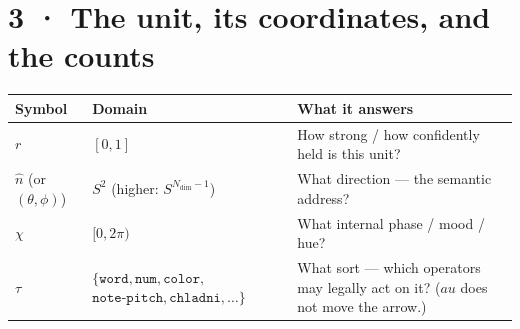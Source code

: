 \documentclass[10.5pt]{article}
\begin{document}
\section*{3 · The unit, its coordinates, and the counts}
{\small\setlength{\tabcolsep}{4pt}\begin{longtable}{L{3.0cm}L{5.4cm}L{7.9cm}}
\toprule
\textbf{Symbol} & \textbf{Domain} & \textbf{What it answers} \\
\midrule
\endhead
$r$ & $[0,1]$ & How strong / how confidently held is this unit? \\
$\hat n$ (or $(\theta,\phi)$) & $S^2$ (higher: $S^{N_{\mathrm{dim}}-1}$) & What direction — the semantic address? \\
$\chi$ & $[0,2\pi)$ & What internal phase / mood / hue? \\
$\tau$ & $\{\mathtt{word},\mathtt{num},\mathtt{color},$ $\mathtt{note\text{-}pitch},\mathtt{chladni},\ldots\}$ & What sort — which operators may legally act on it? ($	au$ does not move the arrow.) \\
\bottomrule
\end{longtable}}
\end{document}
